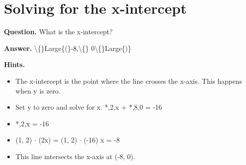 \documentclass{article}
\begin{document}
\section*{Solving for the x-intercept}
\textbf{Question.} What is the x-intercept?

\textbf{Answer.} \textbackslash\{\}Large\{(\}-8,\textbackslash\{\} 0\textbackslash\{\}Large\{)\}

\textbf{Hints.}
\begin{itemize}
  \item The x-intercept is the point where the line crosses the x-axis.  This happens when y is zero.
  \item Set y to zero and solve for x.
            *,2,x + *,8,0 = -16
  \item *,2,x = -16
  \item (1, 2) $\cdot$ (2x) = (1, 2) $\cdot$ (-16)
            x = -8
  \item This line intersects the x-axis at (-8, 0).
\end{itemize}
\end{document}
